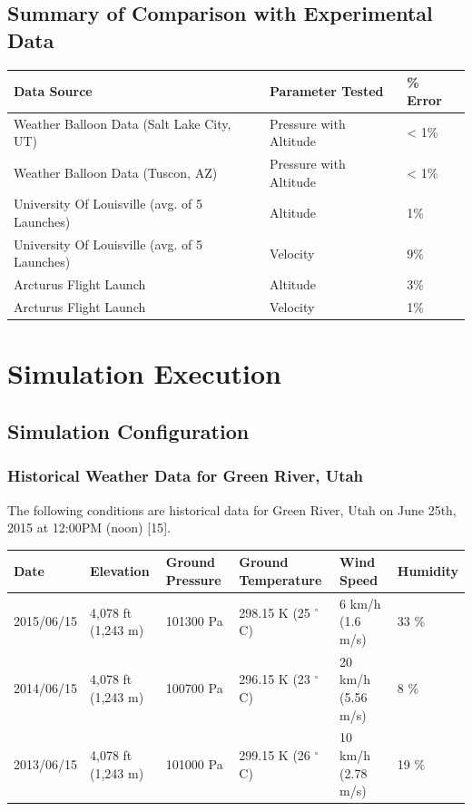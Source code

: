 \documentclass[]{article}
\begin{document}
\subsection{Summary of Comparison with Experimental
Data}\label{summary-of-comparison-with-experimental-data}

\begin{longtable}[c]{@{}lll@{}}
\toprule
Data Source & Parameter Tested & \% Error\tabularnewline
\midrule
\endhead
Weather Balloon Data (Salt Lake City, UT) & Pressure with Altitude &
\textless{} 1\%\tabularnewline
Weather Balloon Data (Tuscon, AZ) & Pressure with Altitude & \textless{}
1\%\tabularnewline
University Of Louisville (avg. of 5 Launches) & Altitude &
1\%\tabularnewline
University Of Louisville (avg. of 5 Launches) & Velocity &
9\%\tabularnewline
Arcturus Flight Launch & Altitude & 3\%\tabularnewline
Arcturus Flight Launch & Velocity & 1\%\tabularnewline
\bottomrule
\end{longtable}


\clearpage

\section{Simulation Execution}\label{simulation-execution}

\subsection{Simulation Configuration}\label{simulation-configuration}

\subsubsection{Historical Weather Data for Green River,
Utah}\label{historical-weather-data-for-green-river-utah}

The following conditions are historical data for Green River, Utah on
June 25th, 2015 at 12:00PM (noon) {[}15{]}.

\begin{longtable}[c]{@{}llllll@{}}
\toprule
Date & Elevation & Ground Pressure & Ground Temperature & Wind Speed &
Humidity\tabularnewline
\midrule
\endhead
2015/06/15 & 4,078 ft (1,243 m) & 101300 Pa & 298.15 K (25 \(^\circ\)C)
& 6 km/h (1.6 m/s) & 33 \%\tabularnewline
2014/06/15 & 4,078 ft (1,243 m) & 100700 Pa & 296.15 K (23 \(^\circ\)C)
& 20 km/h (5.56 m/s) & 8 \%\tabularnewline
2013/06/15 & 4,078 ft (1,243 m) & 101000 Pa & 299.15 K (26 \(^\circ\)C)
& 10 km/h (2.78 m/s) & 19 \%\tabularnewline
\bottomrule
\end{longtable}
\end{document}
